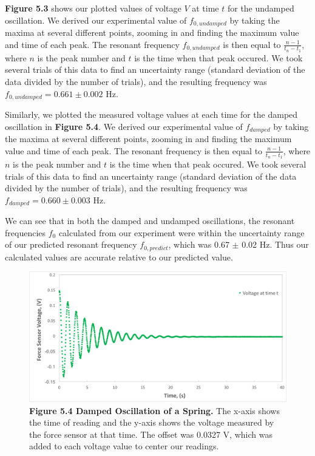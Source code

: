 \documentclass[11pt]{report}
\begin{document}
\textbf{Figure 5.3} shows our plotted values of voltage \(V\) at time \(t\) for
the undamped oscillation. We derived our experimental value of $f_{0, undamped}$ by taking the
maxima at several different points, zooming in and finding the maximum value and
time of each peak.  The resonant frequency $f_{0, undamped}$ is then equal to \(\frac{n -
1}{t_n - t_1}\), where \(n\) is the peak number and \(t\) is the time when that
peak occured. We took several trials of this data to find an uncertainty range
(standard deviation of the data divided by the number of trials),
and the resulting frequency was \(f_{0, undamped} = 0.661 \pm 0.002\) Hz.  

Similarly, we plotted the measured voltage values at each time for the damped
oscillation in \textbf{Figure 5.4}. We derived our experimental value of
$f_{damped}$ by taking the
maxima at several different points, zooming in and finding the maximum value and
time of each peak.  The resonant frequency is then equal to \(\frac{n -
1}{t_n - t_1}\), where \(n\) is the peak number and \(t\) is the time when that
peak occured. We took several trials of this data to find an uncertainty range
(standard deviation of the data divided by the number of trials),
and the resulting frequency was \(f_{damped} = 0.660 \pm 0.003\) Hz.  

We can see that in both the damped and undamped oscillations, the resonant
frequencies \(f_0\) calculated from our experiment were within the uncertainty
range of our predicted resonant frequency \(f_{0, predict}\), which was 0.67
$\pm$ 0.02 Hz.  Thus our calculated values are accurate relative to our
predicted value.



\begin{figure}
    \includegraphics[width=\linewidth]{VoltageTime2.png}
    \captionsetup{labelformat=empty}
    \caption{\textbf{Figure 5.4 Damped Oscillation of a Spring.}  The x-axis
    shows the time of reading and the y-axis shows the voltage measured by the
force sensor at that time.  The offset was 0.0327 V, which was added to each
voltage value to center our readings.}
\end{figure}
\end{document}
